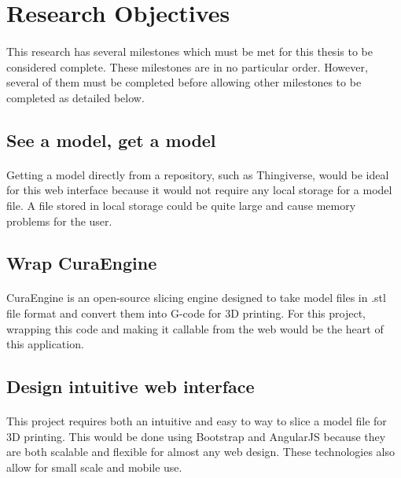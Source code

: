 \section{Research Objectives}
\paragraph{}
This research has several milestones which must be met for this thesis to be considered complete.
These milestones are in no particular order.
However, several of them must be completed before allowing other milestones to be completed as detailed below.

\subsection{See a model, get a model}
\paragraph{}
Getting a model directly from a repository, such as Thingiverse, would be ideal for this web interface because it would not require any local storage for a model file.
A file stored in local storage could be quite large and cause memory problems for the user. 

\subsection{Wrap CuraEngine}
\paragraph{}
CuraEngine is an open-source slicing engine designed to take model files in .stl file format and convert them into G-code for 3D printing.
For this project, wrapping this code and making it callable from the web would be the heart of this application.

\subsection{Design intuitive web interface}
\paragraph{}
This project requires both an intuitive and easy to way to slice a model file for 3D printing.
This would be done using Bootstrap and AngularJS because they are both scalable and flexible for almost any web design.
These technologies also allow for small scale and mobile use.


